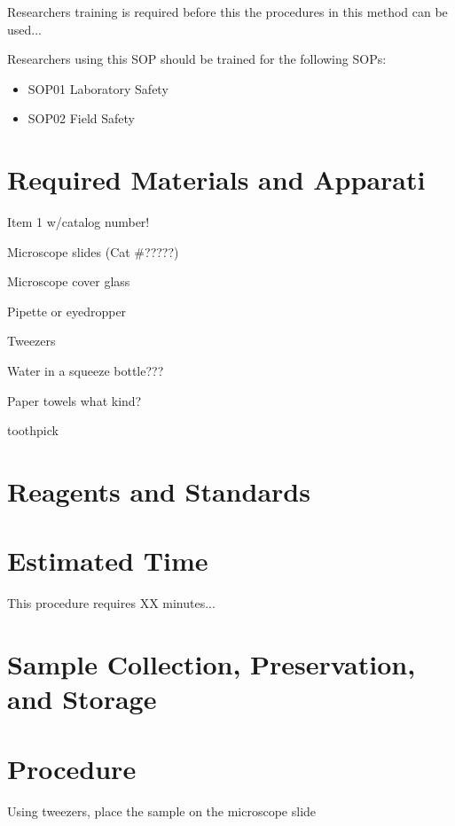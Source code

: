 \documentclass[12pt]{../SOP3_beta}
\begin{document}
\NP Researchers training is required before this the procedures in this method can be used... 

\NP Researchers using this SOP should be trained for the following SOPs:

\begin{itemize}
  \item SOP01 Laboratory Safety
  \item SOP02 Field Safety
\end{itemize}

\section{Required Materials and Apparati}

\NP Item 1 w/catalog number!

\begin{itemize*}
  \item Microscope slides (Cat \#?????)
  \item Microscope cover glass
  \item Pipette or eyedropper
  \item Tweezers
  \item Water in a squeeze bottle???
  \item Paper towels what kind?
  \item toothpick
\end{itemize*}


\section{Reagents and Standards}

\section{Estimated Time}

\NP This procedure requires XX minutes...

\section{Sample Collection, Preservation, and Storage}

\section{Procedure}

\NP Using tweezers, place the sample on the microscope slide
\end{document}
